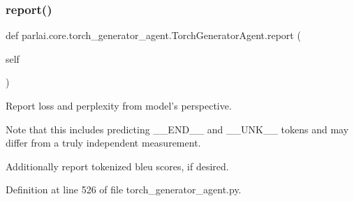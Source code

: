 \subsubsection{\texorpdfstring{report()}{report()}}
{\footnotesize\ttfamily def parlai.\+core.\+torch\+\_\+generator\+\_\+agent.\+Torch\+Generator\+Agent.\+report (\begin{DoxyParamCaption}\item[{}]{self }\end{DoxyParamCaption})}

\begin{DoxyVerb}Report loss and perplexity from model's perspective.

Note that this includes predicting __END__ and __UNK__ tokens and may differ
from a truly independent measurement.

Additionally report tokenized bleu scores, if desired.
\end{DoxyVerb}
 

Definition at line 526 of file torch\+\_\+generator\+\_\+agent.\+py.


